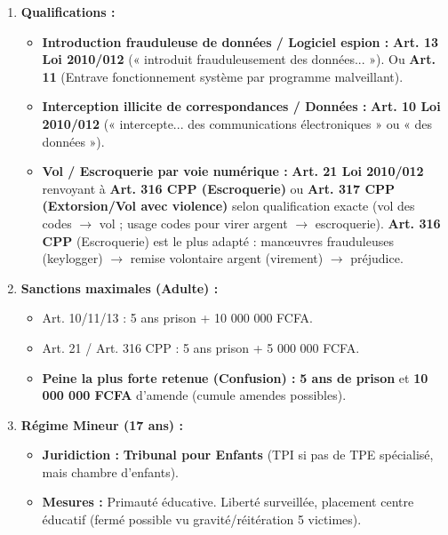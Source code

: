 \documentclass[11pt]{article}
\begin{document}
\begin{corrige}
    \begin{enumerate}
        \item \textbf{Qualifications :}
              \begin{itemize}
                  \item \textbf{Introduction frauduleuse de données / Logiciel espion :} \textbf{Art. 13 Loi 2010/012} (« introduit frauduleusement des données... »). Ou \textbf{Art. 11} (Entrave fonctionnement système par programme malveillant).
                  \item \textbf{Interception illicite de correspondances / Données :} \textbf{Art. 10 Loi 2010/012} (« intercepte... des communications électroniques » ou « des données »).
                  \item \textbf{Vol / Escroquerie par voie numérique :} \textbf{Art. 21 Loi 2010/012} renvoyant à \textbf{Art. 316 CPP (Escroquerie)} ou \textbf{Art. 317 CPP (Extorsion/Vol avec violence)} selon qualification exacte (vol des codes $\rightarrow$ vol ; usage codes pour virer argent $\rightarrow$ escroquerie). \textbf{Art. 316 CPP} (Escroquerie) est le plus adapté : manœuvres frauduleuses (keylogger) $\rightarrow$ remise volontaire argent (virement) $\rightarrow$ préjudice.
              \end{itemize}
        \item \textbf{Sanctions maximales (Adulte) :}
              \begin{itemize}
                  \item Art. 10/11/13 : 5 ans prison + 10 000 000 FCFA.
                  \item Art. 21 / Art. 316 CPP : 5 ans prison + 5 000 000 FCFA.
                  \item \textbf{Peine la plus forte retenue (Confusion) :} \textbf{5 ans de prison} et \textbf{10 000 000 FCFA} d'amende (cumule amendes possibles).
              \end{itemize}
        \item \textbf{Régime Mineur (17 ans) :}
              \begin{itemize}
                  \item \textbf{Juridiction :} \textbf{Tribunal pour Enfants} (TPI si pas de TPE spécialisé, mais chambre d'enfants).
                  \item \textbf{Mesures :} Primauté éducative. Liberté surveillée, placement centre éducatif (fermé possible vu gravité/réitération 5 victimes).

\end{itemize}
\end{enumerate}
\end{corrige}
\end{document}
